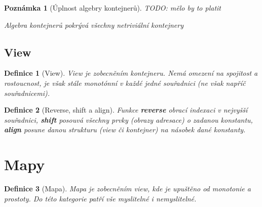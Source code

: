 \documentclass[a4paper,12pt]{article}
\newtheorem{definition}{Definice}[section]
\newtheorem{corollary}{Poznámka}[definition]
\begin{document}
\begin{corollary}[Úplnost algebry kontejnerů]
    TODO: mělo by to platit

    Algebra kontejnerů pokrývá všechny netriviální kontejnery
\end{corollary}

\subsection{View}

\begin{definition}[View]
    View je zobecněním kontejneru. Nemá omezení na spojitost a rostoucnost, je však stále monotónní v každé jedné souřadnici (ne však napříč souřadnicemi).
\end{definition}

\begin{definition}[Reverse, shift a align]
    Funkce \textbf{reverse} obrací indexaci v nejvyšší souřadnici, \textbf{shift} posouvá všechny prvky (obrazy adresace) o zadanou konstantu, \textbf{align} posune danou strukturu (view či kontejner) na násobek dané konstanty.
\end{definition}

\section{Mapy}

\begin{definition}[Mapa]
    Mapa je zobecněním view, kde je upuštěno od monotonie a prostoty. Do této kategorie patří vše myslitelné i nemyslitelné.
\end{definition}
\end{document}
